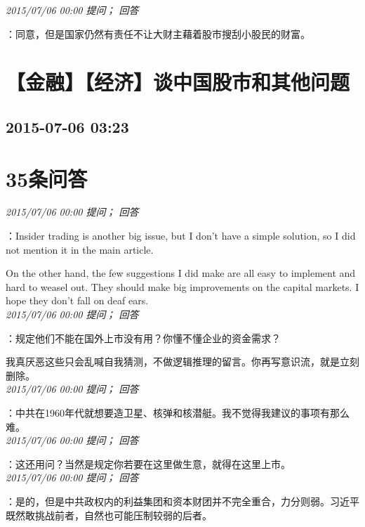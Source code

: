 \documentclass[twocolumn]{ctexart}
\begin{document}
\textit{\hfill\noindent\small 2015/07/06 00:00 提问； 回答}

：同意，但是国家仍然有责任不让大财主藉着股市搜刮小股民的财富。\\


\section{【金融】【经济】谈中国股市和其他问题}
\subsection{2015-07-06 03:23}


\section{35条问答}

\textit{\hfill\noindent\small 2015/07/06 00:00 提问； 回答}

：Insider trading is another big issue, but I don't have a simple solution, so I did not mention it in the main article.

On the other hand, the few suggestions I did make are all easy to implement and hard to weasel out. They should make big improvements on the capital markets. I hope they don't fall on deaf ears.\\

\textit{\hfill\noindent\small 2015/07/06 00:00 提问； 回答}

：规定他们不能在国外上市没有用？你懂不懂企业的资金需求？

我真厌恶这些只会乱喊自我猜测，不做逻辑推理的留言。你再写意识流，就是立刻删除。\\

\textit{\hfill\noindent\small 2015/07/06 00:00 提问； 回答}

：中共在1960年代就想要造卫星、核弹和核潜艇。我不觉得我建议的事项有那么难。\\

\textit{\hfill\noindent\small 2015/07/06 00:00 提问； 回答}

：这还用问？当然是规定你若要在这里做生意，就得在这里上市。\\

\textit{\hfill\noindent\small 2015/07/06 00:00 提问； 回答}

：是的，但是中共政权内的利益集团和资本财团并不完全重合，力分则弱。习近平既然敢挑战前者，自然也可能压制较弱的后者。\\
\end{document}
